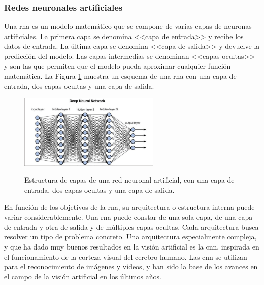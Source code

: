 \subsubsection{Redes neuronales artificiales}
Una \gls{rna} es un modelo matemático que se compone de varias capas de neuronas artificiales. La primera capa se denomina <<capa de entrada>> y recibe los datos de entrada. La última capa se denomina <<capa de salida>> y devuelve la predicción del modelo. Las capas intermedias se denominan <<capas ocultas>> y son las que permiten que el modelo pueda aproximar cualquier función matemática. La Figura \ref{fig:deep_neural_network} muestra un esquema de una \gls{rna} con una capa de entrada, dos capas ocultas y una capa de salida.


\begin{figure}[H]
    \caption[Estructura de capas de una red neuronal artificial]{Estructura de capas de una red neuronal artificial, con una capa de entrada, dos capas ocultas y una capa de salida.}
    \centering
    \includegraphics[width=0.6\textwidth]{./figuras/Deep_neural_network.png}
    \label{fig:deep_neural_network}
\end{figure}

En función de los objetivos de la \gls{rna}, su arquitectura o estructura interna puede variar considerablemente. Una \gls{rna} puede constar de una sola capa, de una capa de entrada y otra de salida y de múltiples capas ocultas. Cada arquitectura busca resolver un tipo de problema concreto. Una arquitectura especialmente compleja, y que ha dado muy buenos resultados en la visión artificial es la \gls{cnn}, inspirada en el funcionamiento de la corteza visual del cerebro humano. Las \gls{cnn} se utilizan para el reconocimiento de imágenes y vídeos, y han sido la base de los avances en el campo de la visión artificial en los últimos años.

